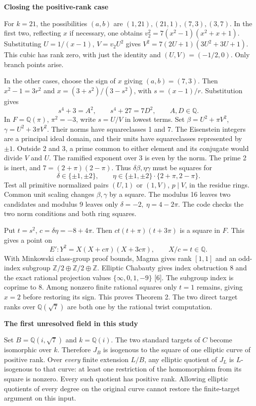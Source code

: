 \documentclass[12pt]{article}
\newcommand{\Q}{\mathbb Q}\newcommand{\Z}{\mathbb Z}
\newcommand{\head}[1]{{\Large\bfseries\color{ink}#1}\par\vspace{3pt}}
\begin{document}
\newpage
\head{Closing the positive-rank case}
For $k=21$, the possibilities $(a,b)$ are $(1,21),(21,1),(7,3),(3,7)$. In the first two, reflecting $x$ if necessary, one obtains $v_2^2=7(x^2-1)(x^2+x+1)$. Substituting $U=1/(x-1)$, $V=v_2 U^2$ gives $V^2=7(2U+1)(3U^2+3U+1)$. This cubic has rank zero, with just the identity and $(U,V)=(-1/2,0)$. Only branch points arise.

In the other cases, choose the sign of $x$ giving $(a,b)=(7,3)$. Then $x^2-1=3r^2$ and $x=(3+s^2)/(3-s^2)$, with $s=(x-1)/r$. Substitution gives
\[
 s^4+3=A^2,\qquad s^4+27=7D^2,\qquad A,D\in\Q.
\]
In $F=\Q(\pi)$, $\pi^2=-3$, write $s=U/V$ in lowest terms. Set $\beta=U^2+\pi V^2$, $\gamma=U^2+3\pi V^2$. Their norms have squareclasses 1 and 7. The Eisenstein integers are a principal ideal domain, and their units have squareclasses represented by $\pm1$. Outside 2 and 3, a prime common to either element and its conjugate would divide $V$ and $U$. The ramified exponent over 3 is even by the norm. The prime 2 is inert, and $7=(2+\pi)(2-\pi)$. Thus $\delta\beta,\eta\gamma$ must be squares for
\[
 \delta\in\{\pm1,\pm2\},\qquad
 \eta\in\{\pm1,\pm2\}\cdot\{2+\pi,2-\pi\}.
\]
Test all primitive normalized pairs $(U,1)$ or $(1,V)$, $p\mid V$, in the residue rings. Common unit scaling changes $\beta,\gamma$ by a square. The modulus 16 leaves two candidates and modulus 9 leaves only $\delta=-2,\ \eta=4-2\pi$. The code checks the two norm conditions and both ring squares.

Put $t=s^2$, $c=\delta\eta=-8+4\pi$. Then $ct(t+\pi)(t+3\pi)$ is a square in $F$. This gives a point on
\[
 E':Y^2=X(X+c\pi)(X+3c\pi),\qquad X/c=t\in\Q .
\]
With Minkowski class-group proof bounds, Magma gives rank $[1,1]$ and an odd-index subgroup $\Z/2\oplus\Z/2\oplus\Z$. Elliptic Chabauty gives index obstruction $8$ and the exact rational projection values $\{\infty,0,1,-9\}$ [6]. The subgroup index is coprime to 8. Among nonzero finite rational squares only $t=1$ remains, giving $x=2$ before restoring its sign. This proves Theorem 2. The two direct target ranks over $\Q(\sqrt7)$ are both one by the rational twist computation.

\newpage
\head{The first unresolved field in this study}
Set $B=\Q(i,\sqrt7)$ and $k=\Q(i)$. The two standard targets of $C$ become isomorphic over $k$. Therefore $J_B$ is isogenous to the square of one elliptic curve of positive rank. Over \emph{every} finite extension $L/B$, any elliptic quotient of $J_L$ is $L$-isogenous to that curve: at least one restriction of the homomorphism from its square is nonzero. Every such quotient has positive rank. Allowing elliptic quotients of every degree on the original curve cannot restore the finite-target argument on this input.
\end{document}
